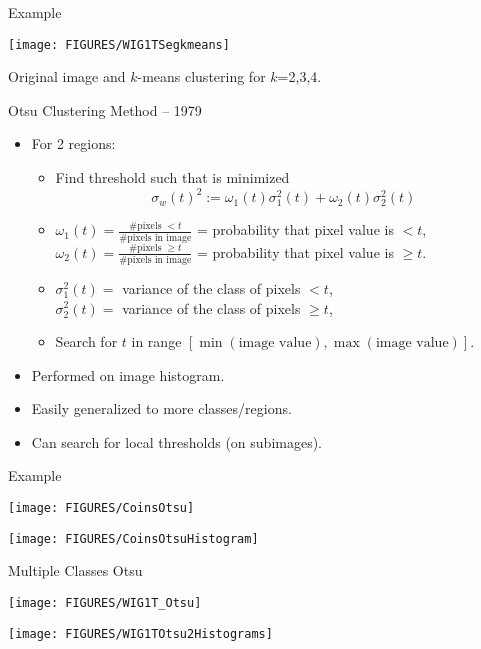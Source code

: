 \documentclass[9pt]{beamer}
\newcommand{\myemph}[1]{{\color{blue}{#1}}}
\begin{document}
\begin{frame}{Example}
  \begin{center}
    \texttt{[image: FIGURES/WIG1TSegkmeans]}
  \end{center}
  Original image and $k$-means clustering for $k$=2,3,4. 
\end{frame}




\begin{frame}[t]{Otsu Clustering Method -- 1979}
  \begin{itemize}
  \item For 2 regions:\vfill
    \begin{itemize}
    \item Find threshold such that \myemph{intraclass variance} is minimized
      $$
      \sigma_w(t)^2 := \omega_1(t)\sigma_1^2(t) + \omega_2(t)\sigma_2^2(t)
      $$
      \vfill
    \item $\omega_1(t) = \frac{\# \text{pixels } < t}{\#\text{pixels in image}}$ = probability that pixel value is $<t$, 
      $\omega_2(t) = \frac{\# \text{pixels } \geq t}{\#\text{pixels in image}}$ = probability that pixel value is $\geq t$.\vfill
    \item $\sigma_1^2(t) = $ variance of the class of pixels $< t$, \\
      $\sigma_2^2(t) = $ variance of the class of pixels $\geq t$, \vfill
    \item Search for $t$ in range $[\min(\text{image value}),\max(\text{image value})]$.
    \end{itemize}
    \vfill
  \item Performed on image histogram.
  \item Easily generalized to more classes/regions.
  \item Can search for local thresholds (on subimages).
  \end{itemize}
\end{frame}

\begin{frame}[t]{Example}
  \begin{center}
    \texttt{[image: FIGURES/CoinsOtsu]}
  \end{center}
  \begin{center}
    \texttt{[image: FIGURES/CoinsOtsuHistogram]}
  \end{center}
\end{frame}


\begin{frame}[t]{Multiple Classes Otsu}
  \begin{center}
    \texttt{[image: FIGURES/WIG1T\_Otsu]}
  \end{center}
  \begin{center}
    \texttt{[image: FIGURES/WIG1TOtsu2Histograms]}
  \end{center}
\end{frame}
\end{document}
